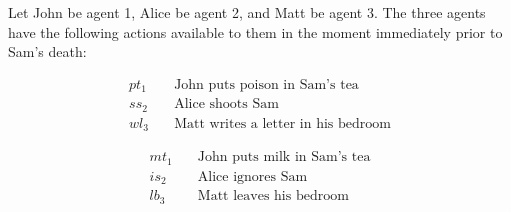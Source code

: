\begin{example}
Let John be agent 1, Alice be agent 2, and Matt be agent 3. The three agents have the following actions available to them in the moment immediately prior to Sam's death:\\
\vspace{-\parskip}\nointerlineskip
\begin{minipage}{.45\linewidth}
    \begin{align*}
        pt_1 &\quad \text{John puts poison in Sam's tea}\\
        ss_2 &\quad \text{Alice shoots Sam}\\
        wl_3 &\quad \text{Matt writes a letter in his bedroom}
    \end{align*}
\end{minipage}
\begin{minipage}{.4\linewidth}
    \begin{align*}
        mt_1 &\quad \text{John puts milk in Sam's tea}\\
        is_2 &\quad \text{Alice ignores Sam}\\
        lb_3 &\quad \text{Matt leaves his bedroom}
    \end{align*}
\end{minipage}


\end{example}

